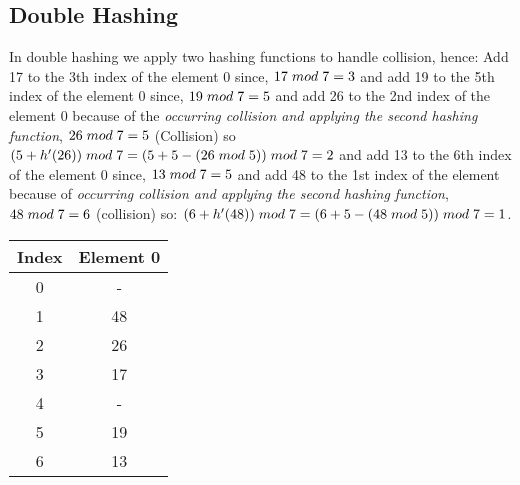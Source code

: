 \documentclass{article}
\begin{document}
\subsection{Double Hashing}
In double hashing we apply two hashing functions to handle collision, hence:
Add 17 to the 3th index of the element 0 since, $17 \hspace{1mm} mod \hspace{1mm} 7 = 3$
 and add 19 to the 5th index of the element 0 since, $19 \hspace{1mm} mod \hspace{1mm} 7 = 5$ and add 26 to the 2nd index of the element 0 because of the \emph{occurring collision and applying the second hashing function}, $26 \hspace{1mm} mod \hspace{1mm} 7 = 5$ (Collision) so $(5 + h'(26)) \hspace{1mm} mod \hspace{1mm} 7 = (5 + 5 - (26 \hspace{1mm} mod \hspace{1mm} 5)) \hspace{1mm} mod \hspace{1mm} 7 = 2$ and add 13 to the 6th index of the element 0 since, $13 \hspace{1mm} mod \hspace{1mm} 7 = 5$ and add 48 to the 1st index of the element because of \emph{occurring collision and applying the second hashing function}, $48 \hspace{1mm} mod \hspace{1mm} 7 = 6$ (collision) so: $(6 + h'(48)) \hspace{1mm} mod \hspace{1mm} 7 = (6 + 5 - (48 \hspace{1mm} mod \hspace{1mm} 5)) \hspace{1mm} mod \hspace{1mm} 7 = 1$.
\vspace{10mm}
\begin{center}
 \begin{tabular}{| c | c |} 
 \hline
 Index & Element 0 \\ [1ex] 
 \hline
 0 & - \\ 
 
 1 & 48 \\
 
 2 & 26 \\
 
 3 & 17 \\
 
 4 & - \\
 
 5 & 19 \\
 
 6 & 13 \\ [1ex] 
 \hline
\end{tabular}
\end{center}
\vspace{10mm}
\end{document}
